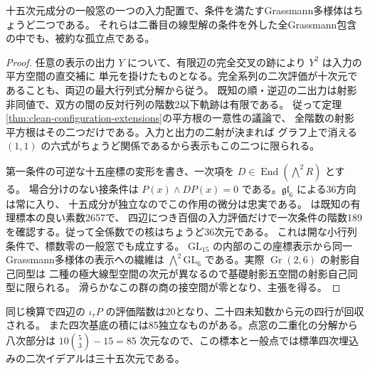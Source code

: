 \begin{corollary}\label{cor:general-edge-two-grassmannians}
十五次元成分の一般窓の一つの入力配置で、条件を満たすGrassmann多様体はちょうど二つである。
それらは二番目の線型解の条件を外した全Grassmann包含の中でも、被約な孤立点である。
\end{corollary}
\begin{proof}
任意の表示の出力 $Y$ について、有限辺の完全交叉の跡により $Y^2$ は入力の平方空間の直交補に
単元を掛けたものとなる。完全系列の二次評価が十次元であることも、両辺の最大行列式分解から従う。
既知の順・逆辺の二出力は射影非同値で、双方の間の反対行列の階数2以下軌跡は有限である。
従って定理\ref{thm:clean-configuration-extensions}の平方根の一意性の議論で、
全階数の射影平方根はその二つだけである。入力と出力の二射が決まれば
グラフ上で消える $(1,1)$ の六式がちょうど関係であるから表示もこの二つに限られる。

第一条件の可逆な十五座標の変形を書き、一次項を $D\in\operatorname{End}(\bigwedge^2 R)$ とする。
場合分けのない接条件は $P(x)\wedge D P(x)=0$ である。$\mathfrak{gl}_6$ による36方向は常に入り、
十五成分が独立なのでこの作用の微分は忠実である。
 は既知の有理標本の良い素数2657で、
四辺につき百個の入力評価だけで一次条件の階数189を確認する。従って全係数での核はちょうど36次元である。
これは開な小行列条件で、標数零の一般窓でも成立する。
$\mathrm{GL}_{15}$ の内部のこの座標表示から同一Grassmann多様体の表示への繊維は
$\bigwedge^2\mathrm{GL}_6$ である。実際 $\operatorname{Gr}(2,6)$ の射影自己同型は
二種の極大線型空間の次元が異なるので基礎射影五空間の射影自己同型に限られる。
滑らかなこの群の商の接空間が零となり、主張を得る。
\end{proof}

同じ検算で四辺の $\iota_rP$ の評価階数は20となり、二十四未知数から元の四行が回収される。
また四次基底の積には85独立なものがある。点窓の二重化の分解から八次部分は
$10\binom{5}{3}-15=85$ 次元なので、この標本と一般点では標準四次埋込みの二次イデアルは三十五次元である。

